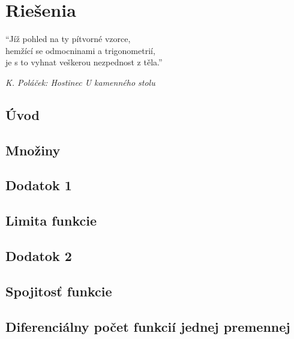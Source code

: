 \chapter{Riešenia}%

\epigraph{
  \enquote{Jíž pohled na ty pítvorné vzorce,\\
  hemžící se odmocninami a trigonometrií,\\
  je s to vyhnat veškerou nezpednost z těla.}
}{\textit{K. Poláček: Hostinec U kamenného stolu}}

\section{Úvod}


\section{Množiny}


\section{Dodatok 1}


\section{Limita funkcie}


\section{Dodatok 2}


\section{Spojitosť funkcie}


\section{Diferenciálny počet funkcií jednej premennej}



